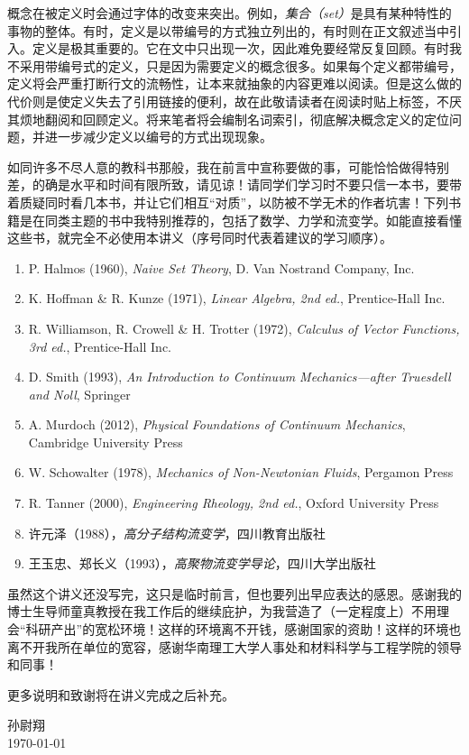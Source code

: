 \documentclass[main.tex]{subfiles}
\begin{document}
概念在被定义时会通过字体的改变来突出。例如，\emph{集合（set）}是具有某种特性的事物的整体。有时，定义是以带编号的方式独立列出的，有时则在正文叙述当中引入。定义是极其重要的。它在文中只出现一次，因此难免要经常反复回顾。有时我不采用带编号式的定义，只是因为需要定义的概念很多。如果每个定义都带编号，定义将会严重打断行文的流畅性，让本来就抽象的内容更难以阅读。但是这么做的代价则是使定义失去了引用链接的便利，故在此敬请读者在阅读时贴上标签，不厌其烦地翻阅和回顾定义。将来笔者将会编制名词索引，彻底解决概念定义的定位问题，并进一步减少定义以编号的方式出现现象。

如同许多不尽人意的教科书那般，我在前言中宣称要做的事，可能恰恰做得特别差，的确是水平和时间有限所致，请见谅！请同学们学习时不要只信一本书，要带着质疑同时看几本书，并让它们相互“对质”，以防被不学无术的作者坑害！下列书籍是在同类主题的书中我特别推荐的，包括了数学、力学和流变学。如能直接看懂这些书，就完全不必使用本讲义（序号同时代表着建议的学习顺序）。
\begin{enumerate}
      \item P. Halmos (1960), \textit{Naive Set Theory}, D. Van Nostrand Company, Inc.
      \item K. Hoffman \& R. Kunze (1971), \textit{Linear Algebra, 2nd ed.}, Prentice-Hall Inc.
      \item R. Williamson, R. Crowell \& H. Trotter (1972), \textit{Calculus of Vector Functions, 3rd ed.}, Prentice-Hall Inc.
      \item D. Smith (1993), \textit{An Introduction to Continuum Mechanics---after Truesdell and Noll}, Springer
      \item A. Murdoch (2012), \textit{Physical Foundations of Continuum Mechanics}, Cambridge University Press
      \item W. Schowalter (1978), \textit{Mechanics of Non-Newtonian Fluids}, Pergamon Press
      \item R. Tanner (2000), \textit{Engineering Rheology, 2nd ed.}, Oxford University Press
      \item 许元泽（1988），\emph{高分子结构流变学}，四川教育出版社
      \item 王玉忠、郑长义（1993），\emph{高聚物流变学导论}，四川大学出版社
\end{enumerate}

虽然这个讲义还没写完，这只是临时前言，但也要列出早应表达的感恩。感谢我的博士生导师童真教授在我工作后的继续庇护，为我营造了（一定程度上）不用理会“科研产出”的宽松环境！这样的环境离不开钱，感谢国家的资助！这样的环境也离不开我所在单位的宽容，感谢华南理工大学人事处和材料科学与工程学院的领导和同事！

更多说明和致谢将在讲义完成之后补充。


\begin{flushright}
      孙尉翔\\
      \today
\end{flushright}
\end{document}
